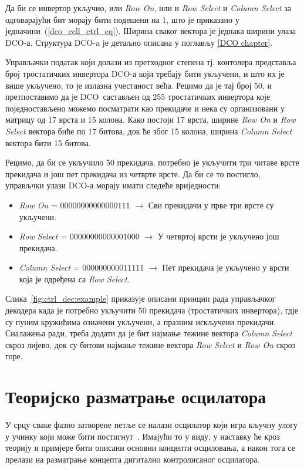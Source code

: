 \documentclass[master]{finthesis}
\def \DCO  {DCO} %
\begin{document}
Да би се инвертор укључио, или \textit{Row On}, или и \textit{Row Select} и \textit{Column Select} за одговарајући бит морају бити подешени на 1, што је приказано у једначини~(\ref{dco_cell_ctrl_eq}). Ширина сваког вектора је једнака ширини улаза \DCO-а. Структура \DCO-a је детаљно описана у поглављу \ref{DCO chapter}. \par 
\vspace{-0.3cm}

Управљачки податак који долази из претходног степена тј. контолера представља број тростатичких инвертора \DCO-а који требају бити укључени, и што их је више укључено, то је излазна учестаност већа. Рецимо да је тај број 50, и претпоставимо да је \DCO\ састављен од 255 тростатичких инвертора које поједностављено можемо посматрати као прекидаче и нека су организовани у матрицу од 17 врста и 15 колона. Како постоји 17 врста, ширине \textit{Row On} и \textit{Row Select} вектора биће по 17 битова, док ће због 15 колона, ширина \textit{Column Select} вектора бити 15 битова. \par
Рецимо, да би се укључило 50 прекидача, потребно је укључити три читаве врсте прекидача и још пет прекидача из четврте врсте. Да би се то постигло, управљчки улази \DCO-а морају имати следеће вриједности:
\begin{itemize}
	\item \textit{Row On} = $00000000000000111$ $\rightarrow$ Сви прекидачи у прве три врсте су укључени. 
	\item \textit{Row Select} = $00000000000001000$ $\rightarrow$ У четвртој врсти је укључено још прекидача.
	\item \textit{Column Select} = $000000000011111$ $\rightarrow$ Пет прекидача је укључено у врсти која је одређена са \textit{Row Select}.
\end{itemize}
Слика~\ref{fig:ctrl_dec:example} приказује описани принцип рада управљачког декодера када је потребно укључити 50 прекидача (тростатичких инвертора), гдје су пуним кружићима означени укључени, а празним искључени прекидачи. Сналажења ради, треба додати да је бит најмање тежине вектора \textit{Column Select} скроз лијево, док су битови најмање тежине вектора \textit{Row Select} и \textit{Row On} скроз горе.

\section{Теоријско разматрање осцилатора} \label{Oscillation basics}
У срцу сваке фазно затворене петље се налази осцилатор који игра кључну улогу у учинку који може бити постигнут~\cite{Razavi:PLL_CMOS_2020}. Имајући то у виду, у наставку ће кроз теорију и примјере бити описани основни концепти осциловања, а након тога се прелази на разматрање концепта дигитално контролисаног осцилатора. \par
\end{document}
